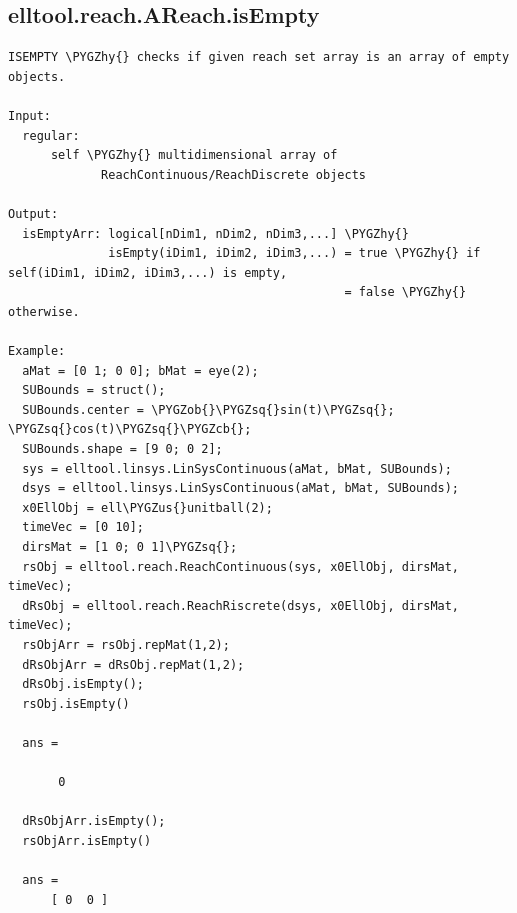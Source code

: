 \documentclass[letterpaper,10pt,english]{sphinxmanual}
\def\PYGZus{\char`\_}
\def\PYGZob{\char`\{}
\def\PYGZcb{\char`\}}
\def\PYGZhy{\char`\-}
\def\PYGZsq{\char`\'}
\begin{document}
\subsection{elltool.reach.AReach.isEmpty}
\label{chap_functions:elltool-reach-areach-isempty}
\begin{Verbatim}[commandchars=\\\{\}]
ISEMPTY \PYGZhy{} checks if given reach set array is an array of empty objects.

Input:
  regular:
      self \PYGZhy{} multidimensional array of
             ReachContinuous/ReachDiscrete objects

Output:
  isEmptyArr: logical[nDim1, nDim2, nDim3,...] \PYGZhy{}
              isEmpty(iDim1, iDim2, iDim3,...) = true \PYGZhy{} if self(iDim1, iDim2, iDim3,...) is empty,
                                               = false \PYGZhy{} otherwise.

Example:
  aMat = [0 1; 0 0]; bMat = eye(2);
  SUBounds = struct();
  SUBounds.center = \PYGZob{}\PYGZsq{}sin(t)\PYGZsq{}; \PYGZsq{}cos(t)\PYGZsq{}\PYGZcb{};
  SUBounds.shape = [9 0; 0 2];
  sys = elltool.linsys.LinSysContinuous(aMat, bMat, SUBounds);
  dsys = elltool.linsys.LinSysContinuous(aMat, bMat, SUBounds);
  x0EllObj = ell\PYGZus{}unitball(2);
  timeVec = [0 10];
  dirsMat = [1 0; 0 1]\PYGZsq{};
  rsObj = elltool.reach.ReachContinuous(sys, x0EllObj, dirsMat, timeVec);
  dRsObj = elltool.reach.ReachRiscrete(dsys, x0EllObj, dirsMat, timeVec);
  rsObjArr = rsObj.repMat(1,2);
  dRsObjArr = dRsObj.repMat(1,2);
  dRsObj.isEmpty();
  rsObj.isEmpty()

  ans =

       0

  dRsObjArr.isEmpty();
  rsObjArr.isEmpty()

  ans =
      [ 0  0 ]
\end{Verbatim}
\end{document}
